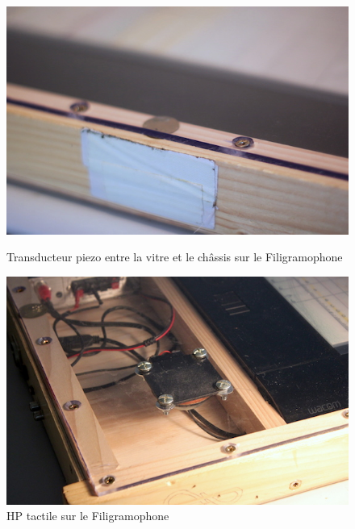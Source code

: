 \begin{figure}[!htbp]
	\captionsetup{format=plain}%
	\centering
	\begin{minipage}[t]{0.48\textwidth}
		\includegraphics[width=\linewidth]{gfx/05_interfaces/filigramophone-piezo_72dpi.jpg}
		\caption{Transducteur piezo entre la vitre et le châssis sur le Filigramophone}
		\label{fig:interface:filigramophone-piezo}
	\end{minipage}
	\hspace{.02\linewidth}
	\begin{minipage}[t]{0.48\textwidth}
		\includegraphics[width=\linewidth]{gfx/05_interfaces/filigramophone_hp_72dpi.jpg}
		\caption{HP tactile sur le Filigramophone}
		\label{fig:interface:filigramophone-hp}
	\end{minipage}
\end{figure}

